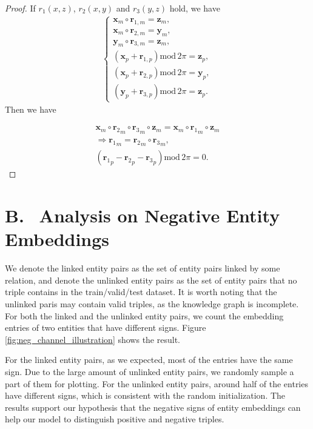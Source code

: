 \documentclass[letterpaper]{article} \usepackage{aaai20}  \usepackage{times}  \usepackage{helvet} \usepackage{courier}  \usepackage[hyphens]{url}  \usepackage{graphicx} \urlstyle{rm} \def\UrlFont{\rm}  \usepackage{graphicx}  \frenchspacing  \setlength{\pdfpagewidth}{8.5in}  \setlength{\pdfpageheight}{11in}
\renewcommand{\mod}{\text{mod}\,}
\begin{document}
\begin{proof}
    If $r_1(x, z)$, $r_2(x, y)$ and $r_3(y, z)$ hold, we have
    \begin{align*}
        \begin{cases}
        \textbf{x}_m\circ \textbf{r}_{1,m}=\textbf{z}_m, \\
        \textbf{x}_m\circ \textbf{r}_{2,m}=\textbf{y}_m, \\ 
        \textbf{y}_m\circ \textbf{r}_{3,m}=\textbf{z}_m, \\
        (\textbf{x}_p+\textbf{r}_{1,p}) \mod 2\pi=\textbf{z}_p, \\
        (\textbf{x}_p+\textbf{r}_{2,p}) \mod 2\pi=\textbf{y}_p, \\ 
        (\textbf{y}_p+\textbf{r}_{3,p}) \mod 2\pi=\textbf{z}_p.
        \end{cases}
    \end{align*}
     Then we have
    
    \begin{gather*}
        \textbf{x}_m \circ {\textbf{r}_2}_m \circ {\textbf{r}_3}_m \circ \textbf{z}_m = \textbf{x}_m \circ {\textbf{r}_1}_m \circ \textbf{z}_m \\
        \Rightarrow {\textbf{r}_1}_m = {\textbf{r}_2}_m \circ {\textbf{r}_3}_m, \\
        ({\textbf{r}_1}_p - {\textbf{r}_2}_p - {\textbf{r}_3}_p) \mod 2\pi = 0.
    \end{gather*}
    
\end{proof}








\section*{B.\,\,\, Analysis on Negative Entity Embeddings}
We denote the linked entity pairs as the set of entity pairs linked by some relation, and denote the unlinked entity pairs as the set of entity pairs that no triple contains in the train/valid/test dataset. It is worth noting that the unlinked paris may contain valid triples, as the knowledge graph is incomplete. For both the linked and the unlinked entity pairs, we count the embedding entries of two entities that have different signs. Figure \ref{fig:neg_channel_illustration} shows the result.

For the linked entity pairs, as we expected, most of the entries have the same sign. Due to the large amount of unlinked entity pairs, we randomly sample a part of them for plotting. For the unlinked entity pairs, around half of the entries have different signs, which is consistent with the random initialization. The results support our hypothesis that the negative signs of entity embeddings can help our model to distinguish positive and negative triples. 
\end{document}
